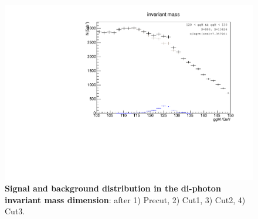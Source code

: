 \documentclass[11pt,a4paper]{cepcnote}
\begin{document}
\begin{figure}[h]
	\includegraphics[scale=0.4,clip]{ggM_IIIXgd4.pdf}
	\caption{\textbf{Signal and background distribution in the di-photon invariant mass dimension}: after 1) Precut, 2) Cut1, 3) Cut2, 4) Cut3.}
	\label{fig:cuts_ggM}
\end{figure}
\end{document}
